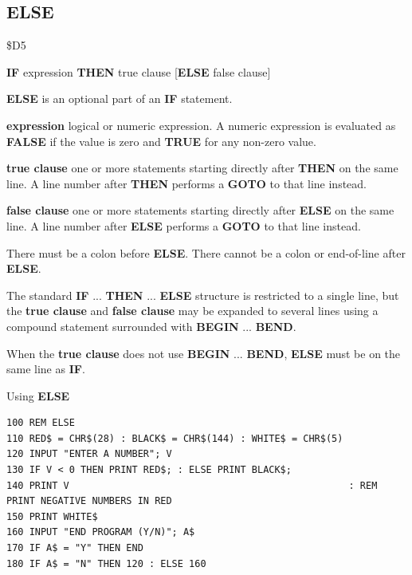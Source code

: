 \subsection{ELSE}
\begin{description}[leftmargin=2cm,style=nextline]
\item [Token:]    \$D5

\item [Format:]   {\bf IF} expression {\bf THEN} true clause [{\bf ELSE} false clause]

\item [Usage:]    {\bf ELSE} is an optional part of an {\bf IF} statement.

                  {\bf expression} logical or numeric expression. A numeric expression is evaluated as {\bf FALSE} if the value is zero and {\bf TRUE} for any non-zero value.

                  {\bf true clause} one or more statements starting directly after {\bf THEN} on the same line. A line number after {\bf THEN} performs a {\bf GOTO} to that line instead.

                  {\bf false clause} one or more statements starting directly after {\bf ELSE} on the same line. A line number after {\bf ELSE} performs a {\bf GOTO} to that line instead.

\item [Remarks:]  There must be a colon before {\bf ELSE}. There cannot be a colon or end-of-line after {\bf ELSE}.

                  The standard {\bf IF} ... {\bf THEN} ... {\bf ELSE} structure is restricted to a single line, but the {\bf true clause} and {\bf false clause} may be expanded to several lines using a compound statement surrounded with {\bf BEGIN} ... {\bf BEND}.

                  When the {\bf true clause} does not use {\bf BEGIN} ... {\bf BEND}, {\bf ELSE} must be on the same line as {\bf IF}.

\item [Examples:] Using {\bf ELSE}

\begin{tcolorbox}[colback=black,coltext=white]
\verbatimfont{\codefont}
\begin{verbatim}
100 REM ELSE
110 RED$ = CHR$(28) : BLACK$ = CHR$(144) : WHITE$ = CHR$(5)
120 INPUT "ENTER A NUMBER"; V
130 IF V < 0 THEN PRINT RED$; : ELSE PRINT BLACK$;
140 PRINT V                                                 : REM PRINT NEGATIVE NUMBERS IN RED
150 PRINT WHITE$
160 INPUT "END PROGRAM (Y/N)"; A$
170 IF A$ = "Y" THEN END
180 IF A$ = "N" THEN 120 : ELSE 160
\end{verbatim}
\end{tcolorbox}


\end{description}
